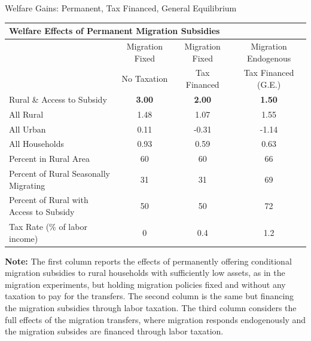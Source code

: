 \documentclass[9pt,pdftex,aspectratio=1610]{beamer}
\theoremstyle{definition}
\begin{document}

\begin{frame}[t]{Welfare Gains: Permanent, Tax Financed, General Equilibrium}
\vspace{-0.25cm}
\begin{table}[!t]
\small
\setlength {\tabcolsep}{2.055mm}
\renewcommand{\arraystretch}{1.30}
\begin{center}
\begin{tabular}{l c c c}
\multicolumn{4}{l}{\textbf{Welfare Effects of Permanent Migration Subsidies}} \\
\hline
\hline
						& Migration Fixed & Migration Fixed & Migration Endogenous \\
						& No Taxation & Tax Financed & Tax Financed (G.E.) \\
						\cmidrule(lr){2-2} \cmidrule(lr){3-3}     \cmidrule(lr){4-4}
Rural \& Access to Subsidy      & \textbf{3.00}  			& \textbf{2.00} 			& \textbf{1.50}  \\
All Rural      &1.48  			& 1.07 			& 1.55  \\
All Urban     & 0.11 			& -0.31 			& -1.14  \\
All Households      & 0.93  			& 0.59 			& 0.63  \\
\hline
Percent in Rural Area				   & 60 			& 60				&  66 \\
Percent of Rural Seasonally Migrating		   & 31 			& 31				&  69 \\
Percent of Rural with Access to Subsidy		   & 50 			& 50				&  72 \\
Tax Rate (\% of labor income)		  		 & 0 			& 0.4				&  1.2 \\
\hline
\end{tabular}
\parbox[t]{5.25in}{%
{\footnotesize  \vspace{0.1cm} \textbf{Note:} The first column reports the effects of permanently offering conditional migration subsidies to rural households with sufficiently low assets, as in the migration experiments, but holding migration policies fixed and without any taxation to pay for the transfers. The second column is the same but financing the migration subsidies through labor taxation. The third column considers the full effects of the migration transfers, where migration responds endogenously and the migration subsides are financed through labor taxation.}
}
\end{center}
\end{table}
\end{frame}
\end{document}
